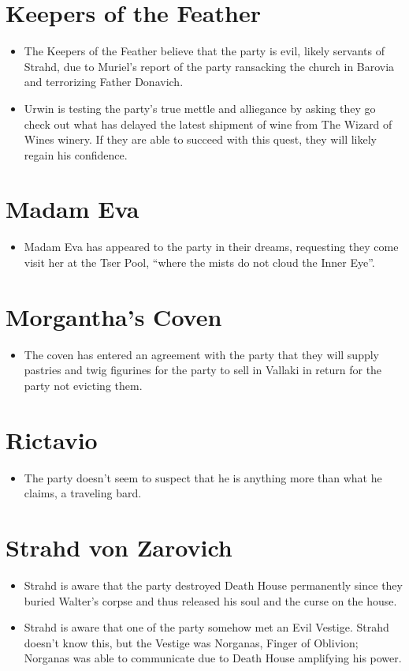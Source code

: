\documentclass[a4paper,11pt]{article}
\begin{document}
\section{Keepers of the Feather}
\begin{itemize}
  \item The Keepers of the Feather believe that the party is evil, likely servants of Strahd, due to Muriel's 
  report of the party ransacking the church in Barovia and terrorizing Father Donavich.
  \item Urwin is testing the party's true mettle and alliegance by asking they go check out what has delayed the
  latest shipment of wine from The Wizard of Wines winery. If they are able to succeed with this quest, they
  will likely regain his confidence.
\end{itemize}

\section{Madam Eva}
\begin{itemize}
  \item Madam Eva has appeared to the party in their dreams, requesting they come visit her at the Tser Pool, 
  ``where the mists do not cloud the Inner Eye''.
\end{itemize}

\section{Morgantha's Coven}
\begin{itemize}
  \item The coven has entered an agreement with the party that they will supply pastries and twig figurines for 
  the party to sell in Vallaki in return for the party not evicting them.
\end{itemize}

\section{Rictavio}
\begin{itemize}
  \item The party doesn't seem to suspect that he is anything more than what he claims, a traveling bard.
\end{itemize}

\section{Strahd von Zarovich}
\begin{itemize}
  \item Strahd is aware that the party destroyed Death House permanently since they buried Walter's corpse and 
  thus released his soul and the curse on the house.
  \item Strahd is aware that one of the party somehow met an Evil Vestige. Strahd doesn't know this, but the 
  Vestige was Norganas, Finger of Oblivion; Norganas was able to communicate due to Death House amplifying his 
  power.
\end{itemize}
\end{document}
